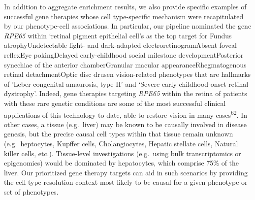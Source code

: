 \documentclass[
]{article}
\begin{document}
In addition to aggregate enrichment results, we also provide specific
examples of successful gene therapies whose cell type-specific mechanism
were recapitulated by our phenotype-cell associations. In particular,
our pipeline nominated the gene \emph{RPE65} within `retinal pigment
epithelial cell's as the top target for Fundus atrophyUndetectable
light- and dark-adapted electroretinogramAbsent foveal reflexEye
pokingDelayed early-childhood social milestone developmentPosterior
synechiae of the anterior chamberGranular macular
appearanceRhegmatogenous retinal detachmentOptic disc drusen
vision-related phenotypes that are hallmarks of 'Leber congenital
amaurosis, type II' and `Severe early-childhood-onset retinal
dystrophy'. Indeed, gene therapies targeting \emph{RPE65} within the
retina of patients with these rare genetic conditions are some of the
most successful clinical applications of this technology to date, able
to restore vision in many cases\textsuperscript{62}. In other cases, a
tissue (e.g.~liver) may be known to be causally involved in disease
genesis, but the precise causal cell types within that tissue remain
unknown (e.g.~heptocytes, Kupffer cells, Cholangiocytes, Hepatic
stellate cells, Natural killer cells, etc.). Tissue-level investigations
(e.g.~using bulk transcriptomics or epigenomics) would be dominated by
hepatocytes, which comprise 75\% of the liver. Our prioritized gene
therapy targets can aid in such scenarios by providing the cell
type-resolution context most likely to be causal for a given phenotype
or set of phenotypes.
\end{document}
